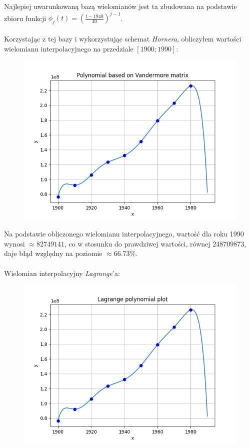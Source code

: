 \documentclass{article}
\begin{document}
Najlepiej uwarunkowaną bazą wielomianów jest
ta zbudowana na podstawie zbioru funkcji $\phi_j(t) = \left(\frac{t-1940}{40}\right)^{j-1}$.
\\\\
Korzystając z tej bazy i wykorzystując schemat \textit{Hornera}, 
obliczyłem wartości wielomianu interpolacyjnego na przedziale $[1900; 1990]$:
\begin{figure}[H]
  \includegraphics[width=\linewidth]{figures/vandermore.png}
\end{figure}
Na podstawie obliczonego wielomianu interpolacyjnego, wartość dla roku
1990 wynosi $\approx 82 749 141$, co w stosunku do prawdziwej wartości,
równej $248 709 873$, daje błąd względny na poziomie $\approx 66.73\%$.
\\\\
Wielomian interpolacyjny \textit{Lagrange}'a:
\begin{figure}[H]
  \includegraphics[width=\linewidth]{figures/lagrange.png}
\end{figure}
\end{document}
